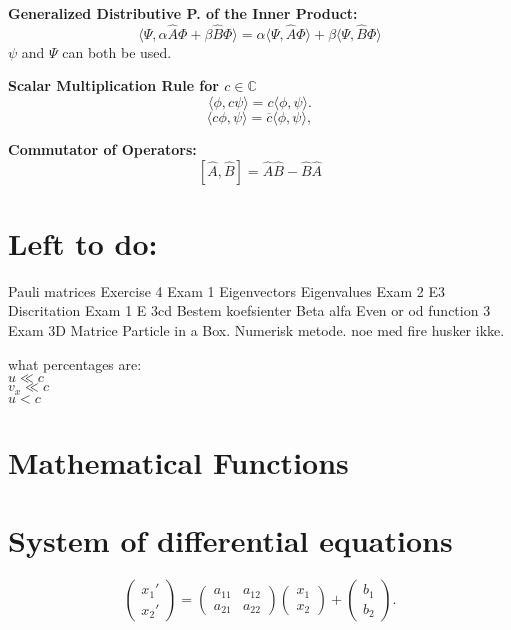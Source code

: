\documentclass[a4paper,11pt]{article}
\renewcommand{\textbf}[1]{{\scriptsize	\bfseries #1}}
\begin{document}
\begin{footnotesize}
\begin{multicols}{2}
\begin{minipage}{\linewidth}
\textbf{Generalized Distributive P. of the Inner Product:}
\[
\langle \Psi, \alpha \hat{A}\Phi + \beta \hat{B}\Phi \rangle = \alpha \langle \Psi, \hat{A}\Phi \rangle + \beta \langle \Psi, \hat{B}\Phi \rangle
\]
$\psi$ and $\Psi$ can both be used.

\textbf{Scalar Multiplication Rule for $c \in \mathbb{C}$}
\[
\langle \phi, c \psi \rangle = c \langle \phi, \psi \rangle.
\]
\[
\langle c \phi, \psi \rangle = \overline{c} \langle \phi, \psi \rangle,
\]



\end{minipage}


\begin{minipage}{\linewidth}
\textbf{Commutator of Operators:} \\[-0.2cm]
\[
[\hat{A}, \hat{B}] = \hat{A} \hat{B} - \hat{B} \hat{A}
\]

\end{minipage}


\section*{Left to do:}
Pauli matrices Exercise 4 Exam 1
Eigenvectors Eigenvalues Exam 2 E3
Discritation
Exam 1 E 3cd
Bestem koefsienter Beta alfa
Even or od function
3 Exam 
3D Matrice Particle in a Box.
Numerisk metode. noe med fire husker ikke.



what percentages are:\\
$u \ll c$\\
$v_x \ll c$\\
$u < c$\\

\begin{minipage}{\linewidth}
\section*{Mathematical Functions}
\section*{System of differential equations}
\[
\begin{pmatrix}
x_1' \\
x_2'
\end{pmatrix}
=
\begin{pmatrix}
a_{11} & a_{12} \\
a_{21} & a_{22}
\end{pmatrix}
\begin{pmatrix}
x_1 \\
x_2
\end{pmatrix}
+
\begin{pmatrix}
b_1 \\
b_2
\end{pmatrix}.
\]



\end{minipage}
\end{multicols}
\end{footnotesize}
\end{document}
